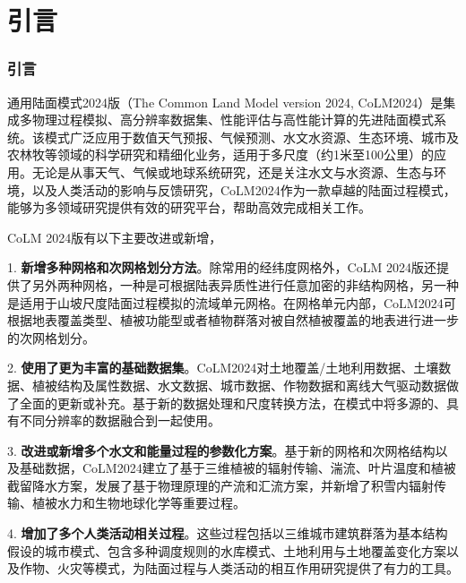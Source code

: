 \part{引言}
\section{引言}


通用陆面模式2024版（The Common Land Model version 2024, CoLM2024）是集成多物理过程模拟、高分辨率数据集、性能评估与高性能计算的先进陆面模式系统。该模式广泛应用于数值天气预报、气候预测、水文水资源、生态环境、城市及农林牧等领域的科学研究和精细化业务，适用于多尺度（约1米至100公里）的应用。无论是从事天气、气候或地球系统研究，还是关注水文与水资源、生态与环境，以及人类活动的影响与反馈研究，CoLM2024作为一款卓越的陆面过程模式，能够为多领域研究提供有效的研究平台，帮助高效完成相关工作。

CoLM 2024版有以下主要改进或新增，

1. \textbf{新增多种网格和次网格划分方法}。除常用的经纬度网格外，CoLM 2024版还提供了另外两种网格，一种是可根据陆表异质性进行任意加密的非结构网格，另一种是适用于山坡尺度陆面过程模拟的流域单元网格。在网格单元内部，CoLM2024可根据地表覆盖类型、植被功能型或者植物群落对被自然植被覆盖的地表进行进一步的次网格划分。

2. \textbf{使用了更为丰富的基础数据集}。CoLM2024对土地覆盖/土地利用数据、土壤数据、植被结构及属性数据、水文数据、城市数据、作物数据和离线大气驱动数据做了全面的更新或补充。基于新的数据处理和尺度转换方法，在模式中将多源的、具有不同分辨率的数据融合到一起使用。

3. \textbf{改进或新增多个水文和能量过程的参数化方案}。基于新的网格和次网格结构以及基础数据，CoLM2024建立了基于三维植被的辐射传输、湍流、叶片温度和植被截留降水方案，发展了基于物理原理的产流和汇流方案，并新增了积雪内辐射传输、植被水力和生物地球化学等重要过程。

4. \textbf{增加了多个人类活动相关过程}。这些过程包括以三维城市建筑群落为基本结构假设的城市模式、包含多种调度规则的水库模式、土地利用与土地覆盖变化方案以及作物、火灾等模式，为陆面过程与人类活动的相互作用研究提供了有力的工具。


